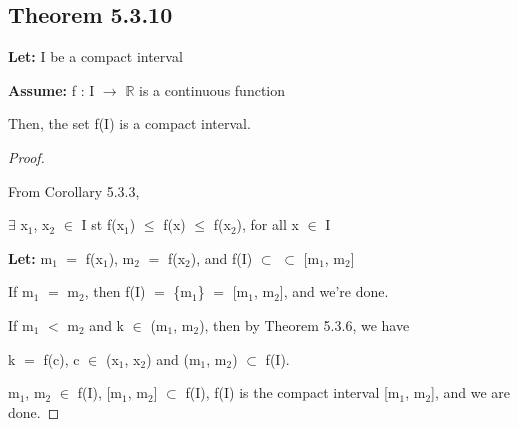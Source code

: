 \documentclass{article}
\newcommand{\mt}[1]{\ensuremath{#1}}
\newcommand\ssc[2][\DefaultOpt]{%
  \def\DefaultOpt{#2}%
  \subsection[#1]{#2}%
}
\newcommand{\bgpf}{\begin{proof} $ $\newline}
\newcommand{\lt}[1]{\textbf{Let: } #1}
\newcommand{\as}[1]{\textbf{Assume: } #1}
\newcommand{\epf}{\end{proof}}
\newcommand{\br}{\mt{\mathbb{R}} }       %
\newcommand{\mem}{\mt{\in} }
\newcommand{\exs}{\mt{\exists} }
\newcommand{\sbs}{\mt{\subset} }         %
\newcommand{\lra}{ \mt{\longrightarrow} } %
\newcommand{\bk}[1]{\{#1\}}
\newcommand{\ls}{\mt{<} }
\newcommand{\lse}{\mt{\leq} }
\newcommand{\eql}{\mt{=} }
\newcommand{\uw}[2]{#1\mt{_{#2}}}
\begin{document}
{\ssc{Theorem 5.3.10}{

\lt{I be a compact interval}

\as{f : I \lra \br is a continuous function}

Then, the set f(I) is a compact interval.

\bgpf

From Corollary 5.3.3,

\exs \uw{x}{1}, \uw{x}{2} \mem I st f(\uw{x}{1}) \lse f(x) \lse f(\uw{x}{2}), for all x \mem I

\lt{\uw{m}{1} \eql f(\uw{x}{1}), \uw{m}{2} \eql f(\uw{x}{2}), and f(I) \sbs \sbs [\uw{m}{1}, \uw{m}{2}]}

If \uw{m}{1} \eql \uw{m}{2}, then f(I) \eql \bk{\uw{m}{1}} \eql [\uw{m}{1}, \uw{m}{2}], and we're done.

If \uw{m}{1} \ls \uw{m}{2} and k \mem (\uw{m}{1}, \uw{m}{2}), then by Theorem 5.3.6, we have

k \eql f(c), c \mem (\uw{x}{1}, \uw{x}{2}) and (\uw{m}{1}, \uw{m}{2}) \sbs f(I).

\uw{m}{1}, \uw{m}{2} \mem f(I), [\uw{m}{1}, \uw{m}{2}] \sbs f(I), f(I) is the compact interval [\uw{m}{1}, \uw{m}{2}], and we are done.

\epf

}

}
\end{document}
